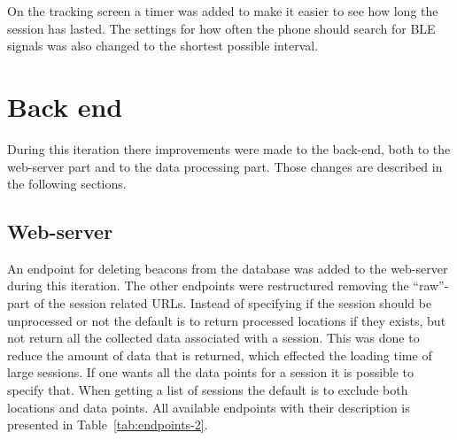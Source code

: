 \documentclass[../Main/thesis.tex]{subfiles}
\begin{document}
On the tracking screen a timer was added to make it easier to see how long the session has lasted.
The settings for how often the phone should search for BLE signals was also changed to the shortest possible interval.

\section{Back end}
During this iteration there improvements were made to the back-end, both to the web-server part and to the data processing part.
Those changes are described in the following sections.

\subsection{Web-server}
An endpoint for deleting beacons from the database was added to the web-server during this iteration.
The other endpoints were restructured removing the ``raw''-part of the session related URLs.
Instead of specifying if the session should be unprocessed or not the default is to return processed locations if they exists, but not return all the collected data associated with a session.
This was done to reduce the amount of data that is returned, which effected the loading time of large sessions.
If one wants all the data points for a session it is possible to specify that.
When getting a list of sessions the default is to exclude both locations and data points.
All available endpoints with their description is presented in Table~\ref{tab:endpoints-2}.
\end{document}

